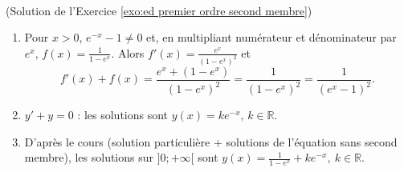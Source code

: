 \begin{corrige}
\begin{sol} ~ \\
(Solution de l'Exercice \ref{exo:ed premier ordre second membre})
\begin{enumerate}
\item Pour $x > 0$, $e^{-x} - 1 \neq 0$ et, en multipliant num\'erateur et d\'enominateur par $e^{x}$,
      $f(x) = \frac{1}{1 - e^{x}}$. Alors $f'(x) = \frac{e^{x}}{(1 - e^{x})^2}$ et
      \[
      f'(x) + f(x) = \frac{e^{x} + (1 - e^{x})}{(1 - e^{x})^2} = \frac{1}{(1 - e^{x})^2} = \frac{1}{(e^{x} - 1)^2} .
      \]
\item $y' + y = 0$ : les solutions sont $y(x) = k e^{-x}$, $k \in \mathbb{R}$.
\item D'apr\`es le cours (solution particuli\`ere + solutions de l'\'equation sans second membre), les solutions sur $]0;+\infty[$ sont
      $\boxed{y(x) = \frac{1}{1 - e^{x}} + k e^{-x}, \ k \in \mathbb{R}}$.
\end{enumerate}
\end{sol}


\end{corrige}

